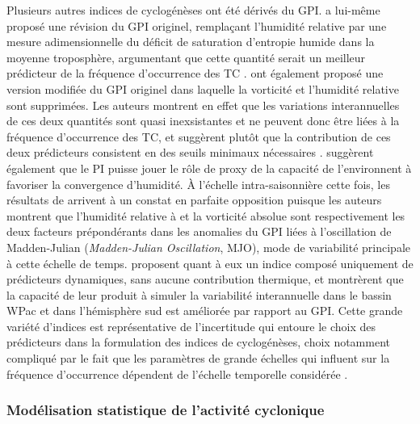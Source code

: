 \documentclass[../main.tex]{subfiles}
\begin{document}
Plusieurs autres indices de cyclogénèses ont été dérivés du GPI. \textcite{emanuel_tropical_2010} a lui-même proposé une révision du GPI originel, remplaçant
l'humidité relative par une mesure adimensionnelle du déficit de saturation d'entropie humide dans la moyenne troposphère, argumentant que cette quantité serait
un meilleur prédicteur de la fréquence d'occurrence des TC \parencite{emanuel_hurricanes_2008}. \textcite{bruyere_investigating_2012} ont également proposé une
version modifiée du GPI originel dans laquelle la vorticité et l'humidité relative sont supprimées. Les auteurs montrent en effet que les variations
interannuelles de ces deux quantités sont quasi inexsistantes et ne peuvent donc être liées à la fréquence d'occurrence des TC, et suggèrent plutôt que la
contribution de ces deux prédicteurs consistent en des seuils minimaux nécessaires \parencite{mcgauley_measuring_2011}. \citeauthor{bruyere_investigating_2012}
suggèrent également que le PI puisse jouer le rôle de proxy de la capacité de l'environnent à favoriser la convergence d'humidité. À l'échelle intra-saisonnière
cette fois, les résultats de \textcite{camargo_diagnosis_2009} arrivent à un constat en parfaite opposition puisque les auteurs montrent que l'humidité relative
à  et la vorticité absolue sont respectivement les deux facteurs prépondérants dans les anomalies du GPI liées à l'oscillation de Madden-Julian
(\textit{Madden-Julian Oscillation}, MJO), mode de variabilité principale à cette échelle de temps. \textcite{wang_dynamic_2020} proposent quant à eux un indice
composé uniquement de prédicteurs dynamiques, sans aucune contribution thermique, et montrèrent que la capacité de leur produit à simuler la variabilité
interannuelle dans le bassin WPac et dans l'hémisphère sud est améliorée par rapport au GPI. Cette grande variété d'indices est représentative de l'incertitude
qui entoure le choix des prédicteurs dans la formulation des indices de cyclogénèses, choix notamment compliqué par le fait que les paramètres de grande
échelles qui influent sur la fréquence d'occurrence dépendent de l'échelle temporelle considérée \parencite{wang_anomalous_2017}.

\subsubsection{Modélisation statistique de l'activité cyclonique}\label{sec:modelisation_stat}
\end{document}

